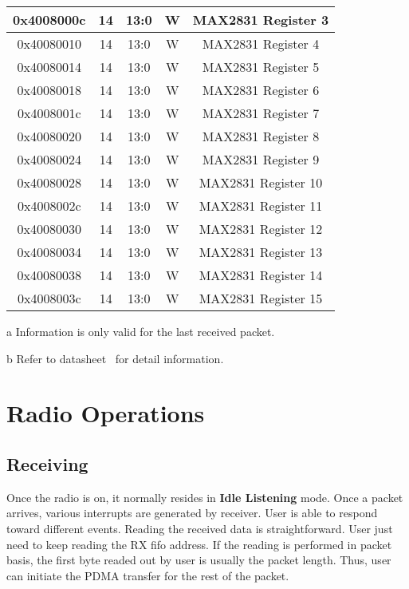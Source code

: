 \begin{table*}[h]
\begin{threeparttable}
\begin{tabular}{|c|c|c|c|c|}
		0x4008000c & 14	& 13:0	& W		& MAX2831 Register 3\tnote{b}\\ \hline
		0x40080010 & 14	& 13:0	& W		& MAX2831 Register 4\tnote{b}\\ \hline
		0x40080014 & 14	& 13:0	& W		& MAX2831 Register 5\tnote{b}\\ \hline
		0x40080018 & 14	& 13:0	& W		& MAX2831 Register 6\tnote{b}\\ \hline
		0x4008001c & 14	& 13:0	& W		& MAX2831 Register 7\tnote{b}\\ \hline
		0x40080020 & 14	& 13:0	& W		& MAX2831 Register 8\tnote{b}\\ \hline
		0x40080024 & 14	& 13:0	& W		& MAX2831 Register 9\tnote{b}\\ \hline
		0x40080028 & 14	& 13:0	& W		& MAX2831 Register 10\tnote{b}\\ \hline
		0x4008002c & 14	& 13:0	& W		& MAX2831 Register 11\tnote{b}\\ \hline
		0x40080030 & 14	& 13:0	& W		& MAX2831 Register 12\tnote{b}\\ \hline
		0x40080034 & 14	& 13:0	& W		& MAX2831 Register 13\tnote{b}\\ \hline
		0x40080038 & 14	& 13:0	& W		& MAX2831 Register 14\tnote{b}\\ \hline
		0x4008003c & 14	& 13:0	& W		& MAX2831 Register 15\tnote{b}\\ \hline
	\end{tabular}
	\begin{tablenotes}
		\item [a] Information is only valid for the last received packet.
		\item [b] Refer to datasheet~\cite{MAX2831} for detail information.
	\end{tablenotes}
\end{threeparttable}
\end{table*}

\clearpage
\section{Radio Operations}
\subsection{Receiving}
Once the radio is on, it normally resides in {\bf Idle Listening} mode. Once a packet arrives,
various interrupts are generated by receiver. User is able to respond toward different events.
Reading the received data is straightforward. User just need to keep reading the RX fifo address.
If the reading is performed in packet basis, the first byte readed out by user is usually the packet
length. Thus, user can initiate the PDMA transfer for the rest of the packet.

